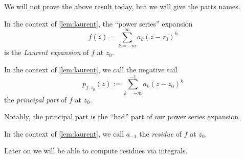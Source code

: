 We will not prove the above result today, but we will give the parts names.
\begin{definition}
	In the context of \autoref{lem:laurent}, the ``power series'' expansion
	\[f(z)=\sum_{k=-m}^\infty a_k(z-z_0)^k\]
	is the \textit{Laurent expansion} of $f$ at $z_0$.
\end{definition}
\begin{definition}
	In the context of \autoref{lem:laurent}, we call the negative tail
	\[p_{f,z_0}(z):=\sum_{k=-m}^{-1}a_k(z-z_0)^k\]
	the \textit{principal part} of $f$ at $z_0$.
\end{definition}
Notably, the principal part is the ``bad'' part of our power series expansion.
\begin{definition}
	In the context of \autoref{lem:laurent}, we call $a_{-1}$ the \textit{residue} of $f$ at $z_0$.
\end{definition}
Later on we will be able to compute residues via integrals.